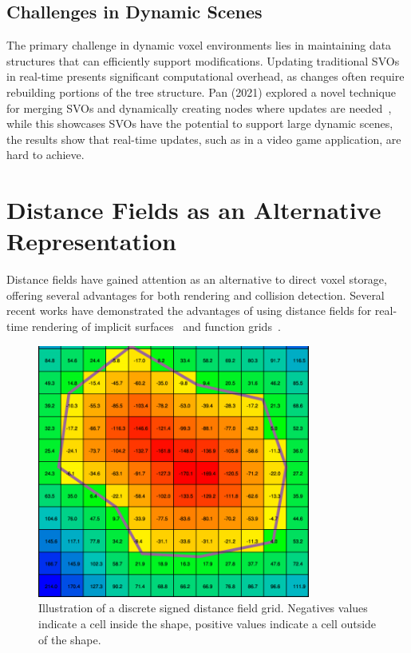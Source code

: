 \subsection{Challenges in Dynamic Scenes}
The primary challenge in dynamic voxel environments lies in maintaining data structures that can efficiently support
modifications. Updating traditional SVOs in real-time presents significant computational overhead, as changes often
require rebuilding portions of the tree structure. Pan (2021) explored a novel technique for merging SVOs and
dynamically creating nodes where updates are needed~\cite{pan2021dynamic}, while this showcases SVOs have the potential
to support large dynamic scenes, the results show that real-time updates, such as in a video game application, are hard
to achieve.

\section{Distance Fields as an Alternative Representation}
Distance fields have gained attention as an alternative to direct voxel storage, offering several advantages for both
rendering and collision detection. Several recent works have demonstrated the advantages of using distance fields for
real-time rendering of implicit surfaces~\cite{hadji2021raymarching} and function grids~\cite{soderlund2022ray}.

\begin{figure}[thp]
    \begin{center}
        \includegraphics[width=0.8\textwidth]{figures/distance_field.png}
    \end{center}
    \caption{Illustration of a discrete signed distance field grid. Negatives values indicate a cell inside the shape,
    positive values indicate a cell outside of the shape.}
\end{figure}

